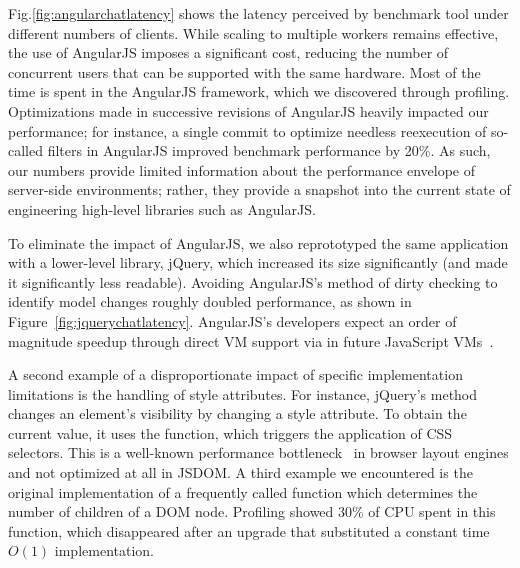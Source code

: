 Fig.\ref{fig:angularchatlatency} shows the latency perceived by benchmark tool
under different numbers of clients. While scaling to multiple workers remains effective,
the use of AngularJS imposes a significant cost, reducing the number of concurrent users 
that can be supported with the same hardware.  Most of the time is spent in the AngularJS
framework, which we discovered through profiling.  Optimizations made in successive revisions
of AngularJS heavily impacted our performance; for instance, a single commit to optimize
needless reexecution of so-called filters in AngularJS improved benchmark performance by 20\%.
As such, our numbers provide limited information about the performance envelope of
server-side environments; rather, they provide a snapshot into the current state of
engineering high-level libraries such as AngularJS.  

\jquerychatlatency{}
To eliminate the impact of AngularJS, we also reprototyped the same application with a
lower-level library, jQuery, which increased its size significantly (and made it significantly
less readable).  Avoiding AngularJS's method of dirty checking to identify model changes
roughly doubled performance, as shown in Figure~\ref{fig:jquerychatlatency}.
AngularJS's developers expect an order of magnitude speedup through direct VM 
support via  in future JavaScript VMs~\cite{angularjsspeedup}.

A second example of a disproportionate impact of specific implementation limitations
is the handling of style attributes.  For instance, jQuery's  method changes an element's
visibility by changing a style attribute.  To obtain the current value, it uses the
 function, which triggers the application of CSS selectors.
This is a well-known performance bottleneck~\cite{Meyerovich+:WWW2010} in browser
layout engines and not optimized at all in JSDOM.  A third example we encountered 
is the original implementation of a frequently called function 
which determines the number of children of a DOM node.  Profiling showed 30\% of CPU
spent in this function, which disappeared after an upgrade that substituted a
constant time $O(1)$ implementation.